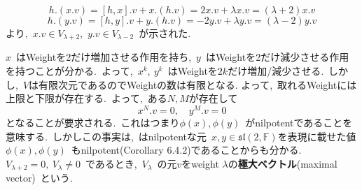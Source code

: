 \documentclass[uplatex,dvipdfmx]{jsarticle}
\begin{document}
\begin{myproof}
    \begin{equation*}
        h.(x.v) = [h,x].v + x.(h.v) = 2x.v + \lambda x.v = (\lambda + 2)x.v
    \end{equation*}
    \begin{equation*}
        h.(y.v) = [h,y].v + y.(h.v) = -2y.v + \lambda y.v = (\lambda - 2)y.v
    \end{equation*}
    より,~$x.v \in V_{\lambda + 2}$,~$y.v \in V_{\lambda - 2}$~が示された.
\end{myproof}
$x$~はWeightを2だけ増加させる作用を持ち,~$y$~はWeightを2だけ減少させる作用を持つことが分かる.~よって,~$x^k,~y^k$~はWeightを$2k$だけ増加/減少させる.~しかし,~$V$は有限次元であるのでWeightの数は有限となる.
よって,~取れるWeightには上限と下限が存在する.~よって,~ある$N,M$が存在して
\begin{equation*}
    x^{N}.v = 0, \quad y^{M}.v = 0
\end{equation*}
となることが要求される.~これはつまり$\phi(x),\phi(y)$~がnilpotentであることを意味する.~しかしこの事実は,~はnilpotentな元~$x,y\in \mathfrak{sl} (2,\mathbb{F})$を表現に載せた値$\phi(x),\phi(y)$~もnilpotent(Corollary 6.4.2)であることからも分かる.\\
$V_{\lambda+2} = 0 ,~V_{\lambda} \neq 0$~であるとき,~$V_\lambda$~の元$v$をweight $\lambda$の\textbf{極大ベクトル}(maximal vector)~という.
\newpage
\end{document}

